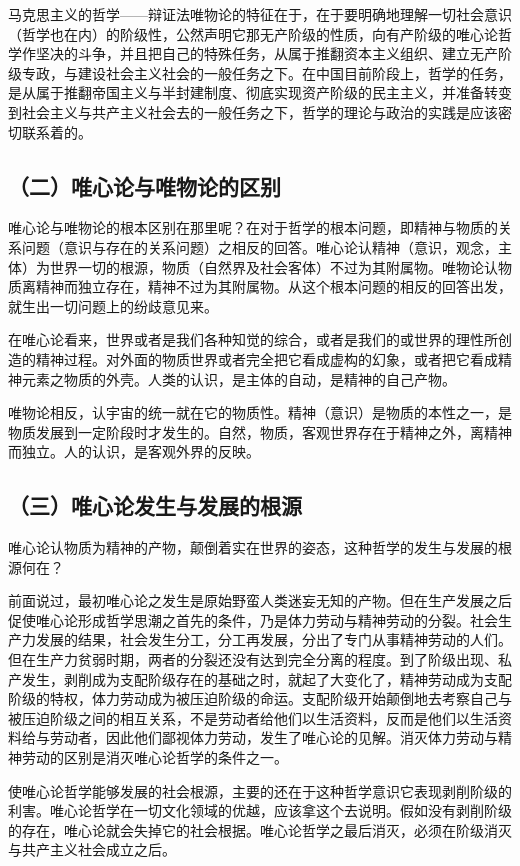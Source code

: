 马克思主义的哲学——辩证法唯物论的特征在于，在于要明确地理解一切社会意识（哲学也在内）的阶级性，公然声明它那无产阶级的性质，向有产阶级的唯心论哲学作坚决的斗争，并且把自己的特殊任务，从属于推翻资本主义组织、建立无产阶级专政，与建设社会主义社会的一般任务之下。在中国目前阶段上，哲学的任务，是从属于推翻帝国主义与半封建制度、彻底实现资产阶级的民主主义，并准备转变到社会主义与共产主义社会去的一般任务之下，哲学的理论与政治的实践是应该密切联系着的。

\subsection{（二）唯心论与唯物论的区别}

唯心论与唯物论的根本区别在那里呢？在对于哲学的根本问题，即精神与物质的关系问题（意识与存在的关系问题）之相反的回答。唯心论认精神（意识，观念，主体）为世界一切的根源，物质（自然界及社会客体）不过为其附属物。唯物论认物质离精神而独立存在，精神不过为其附属物。从这个根本问题的相反的回答出发，就生出一切问题上的纷歧意见来。

在唯心论看来，世界或者是我们各种知觉的综合，或者是我们的或世界的理性所创造的精神过程。对外面的物质世界或者完全把它看成虚构的幻象，或者把它看成精神元素之物质的外壳。人类的认识，是主体的自动，是精神的自己产物。

唯物论相反，认宇宙的统一就在它的物质性。精神（意识）是物质的本性之一，是物质发展到一定阶段时才发生的。自然，物质，客观世界存在于精神之外，离精神而独立。人的认识，是客观外界的反映。

\subsection{（三）唯心论发生与发展的根源}

唯心论认物质为精神的产物，颠倒着实在世界的姿态，这种哲学的发生与发展的根源何在？

前面说过，最初唯心论之发生是原始野蛮人类迷妄无知的产物。但在生产发展之后促使唯心论形成哲学思潮之首先的条件，乃是体力劳动与精神劳动的分裂。社会生产力发展的结果，社会发生分工，分工再发展，分出了专门从事精神劳动的人们。但在生产力贫弱时期，两者的分裂还没有达到完全分离的程度。到了阶级出现、私产发生，剥削成为支配阶级存在的基础之时，就起了大变化了，精神劳动成为支配阶级的特权，体力劳动成为被压迫阶级的命运。支配阶级开始颠倒地去考察自己与被压迫阶级之间的相互关系，不是劳动者给他们以生活资料，反而是他们以生活资料给与劳动者，因此他们鄙视体力劳动，发生了唯心论的见解。消灭体力劳动与精神劳动的区别是消灭唯心论哲学的条件之一。

使唯心论哲学能够发展的社会根源，主要的还在于这种哲学意识它表现剥削阶级的利害。唯心论哲学在一切文化领域的优越，应该拿这个去说明。假如没有剥削阶级的存在，唯心论就会失掉它的社会根据。唯心论哲学之最后消灭，必须在阶级消灭与共产主义社会成立之后。

